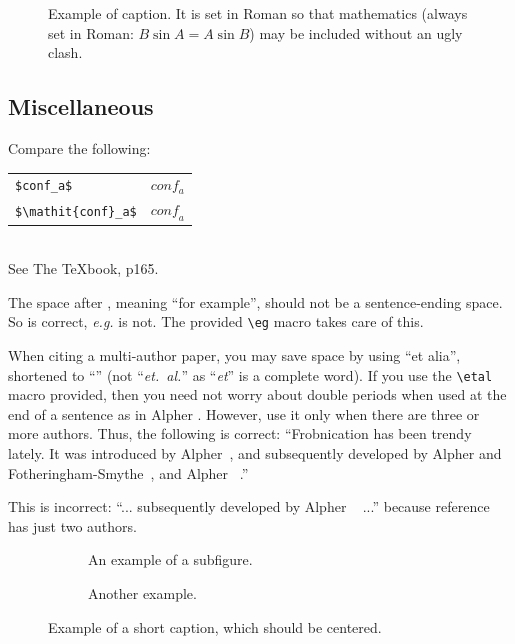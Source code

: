 \documentclass[10pt,twocolumn,letterpaper]{article}
\begin{document}
\begin{figure}[t]
  \centering
  \fbox{\rule{0pt}{2in} \rule{0.9\linewidth}{0pt}}

   \caption{Example of caption.
   It is set in Roman so that mathematics (always set in Roman: $B \sin A = A \sin B$) may be included without an ugly clash.}
   \label{fig:onecol}
\end{figure}

\subsection{Miscellaneous}

\noindent
Compare the following:\\
\begin{tabular}{ll}
 \verb'$conf_a$' &  $conf_a$ \\
 \verb'$\mathit{conf}_a$' & $\mathit{conf}_a$
\end{tabular}\\
See The \TeX book, p165.

The space after \eg, meaning ``for example'', should not be a sentence-ending space.
So \eg is correct, {\em e.g.} is not.
The provided \verb'\eg' macro takes care of this.

When citing a multi-author paper, you may save space by using ``et alia'', shortened to ``\etal'' (not ``{\em et.\ al.}'' as ``{\em et}'' is a complete word).
If you use the \verb'\etal' macro provided, then you need not worry about double periods when used at the end of a sentence as in Alpher \etal.
However, use it only when there are three or more authors.
Thus, the following is correct:
   ``Frobnication has been trendy lately.
   It was introduced by Alpher~\cite{Alpher02}, and subsequently developed by
   Alpher and Fotheringham-Smythe~\cite{Alpher03}, and Alpher \etal~\cite{Alpher04}.''

This is incorrect: ``... subsequently developed by Alpher \etal~\cite{Alpher03} ...'' because reference~\cite{Alpher03} has just two authors.




\begin{figure}
  \centering
  \begin{subfigure}{0.5\linewidth}
    \fbox{\rule{0pt}{2in} \rule{.9\linewidth}{0pt}}
    \caption{An example of a subfigure.}
    \label{fig:short-a}
  \end{subfigure}
  \hfill
  \begin{subfigure}{0.4\linewidth}
    \fbox{\rule{0pt}{2in} \rule{.9\linewidth}{0pt}}
    \caption{Another example.}
    \label{fig:short-b}
  \end{subfigure}
  \caption{Example of a short caption, which should be centered.}
  \label{fig:short}
\end{figure}
\end{document}
